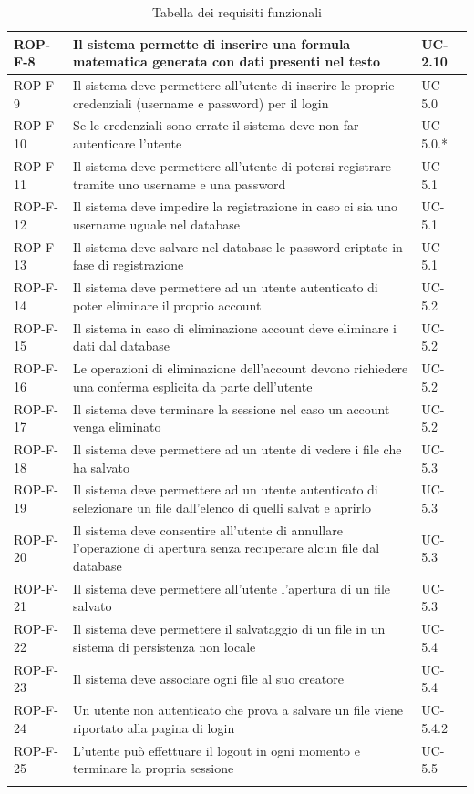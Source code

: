 \documentclass[11pt,a4paper]{article}
\begin{document}
\begin{longtable}{|p{}|>{\raggedright\arraybackslash}p{}|p{}|}
\hline
ROP-F-8 & Il sistema permette di inserire una formula matematica generata con dati presenti nel testo & UC-2.10 \\
\hline
ROP-F-9 & Il sistema deve permettere all'utente di inserire le proprie credenziali (username e password) per il login & UC-5.0 \\
\hline
ROP-F-10 & Se le credenziali sono errate il sistema deve non far autenticare l'utente & UC-5.0.* \\
\hline
ROP-F-11 & Il sistema deve permettere all'utente di potersi registrare tramite uno username e una password & UC-5.1 \\
\hline
ROP-F-12 & Il sistema deve impedire la registrazione in caso ci sia uno username uguale nel database & UC-5.1 \\
\hline
ROP-F-13 & Il sistema deve salvare nel database le password criptate in fase di registrazione & UC-5.1 \\
\hline
ROP-F-14 & Il sistema deve permettere ad un utente autenticato di poter eliminare il proprio account & UC-5.2 \\
\hline
ROP-F-15 & Il sistema in caso di eliminazione account deve eliminare i dati dal database & UC-5.2 \\
\hline
ROP-F-16 & Le operazioni di eliminazione dell'account devono richiedere una conferma esplicita da parte dell'utente & UC-5.2 \\
\hline
ROP-F-17 & Il sistema deve terminare la sessione nel caso un account venga eliminato & UC-5.2 \\
\hline
ROP-F-18 & Il sistema deve permettere ad un utente di vedere i file che ha salvato & UC-5.3 \\
\hline
ROP-F-19 & Il sistema deve permettere ad un utente autenticato di selezionare un file dall'elenco di quelli salvat e aprirlo & UC-5.3 \\
\hline
ROP-F-20 & Il sistema deve consentire all'utente di annullare l'operazione di apertura senza recuperare alcun file dal database & UC-5.3 \\
\hline
ROP-F-21 & Il sistema deve permettere all'utente l'apertura di un file salvato & UC-5.3 \\
\hline
ROP-F-22 & Il sistema deve permettere il salvataggio di un file in un sistema di persistenza non locale & UC-5.4 \\
\hline
ROP-F-23 & Il sistema deve associare ogni file al suo creatore & UC-5.4 \\
\hline
ROP-F-24 & Un utente non autenticato che prova a salvare un file viene riportato alla pagina di login  & UC-5.4.2 \\
\hline
ROP-F-25 & L'utente può effettuare il logout in ogni momento e terminare la propria sessione & UC-5.5 \\

\addlinespace[1em]
\caption{Tabella dei requisiti funzionali}
\end{longtable}
\end{document}

